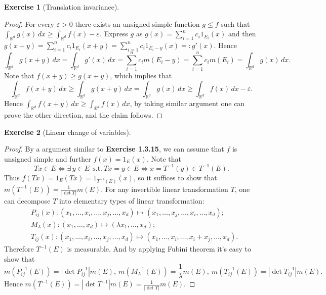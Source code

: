 \documentclass[a4paper]{article}
\newtheorem{ex}{Exercise}[subsection]
\begin{document}
\begin{ex}[Translation invariance]\end{ex}
\begin{proof}
For every $\varepsilon > 0$ there exists an unsigned simple function $g \leq f$ such that 
$\int_{\mathbb{R}^d} g(x)\,dx \geq \int_{\mathbb{R}^d} f(x) - \varepsilon$. Express $g$ as $g(x) = \sum_{i = 1}^n c_i1_{E_i}(x)$ and 
then $g(x + y) = \sum_{i = 1}^n c_i1_{E_i}(x + y) = \sum_{i = 1}^n c_i1_{E_i - y}(x) =: g'(x)$. Hence$$
\int_{\mathbb{R}^d}g(x + y)\,dx = \int_{\mathbb{R}^d} g'(x)\,dx = \sum_{i = 1}^n c_im(E_i - y) = 
\sum_{i = 1}^n c_im(E_i) = \int_{\mathbb{R}^d}g(x)\,dx.
$$Note that $f(x + y) \geq g(x + y)$, which implies that $$
\int_{\mathbb{R}^d} f(x + y)\,dx \geq \int_{\mathbb{R}^d} g(x + y)\,dx = \int_{\mathbb{R}^d} g(x)\,dx \geq 
\int_{\mathbb{R}^d} f(x)\,dx - \varepsilon.
$$Hence $\int_{\mathbb{R}^d} f(x + y)\,dx \geq \int_{\mathbb{R}^d} f(x)\,dx$, by taking similar argument one can 
prove the other direction, and the claim follows.
\end{proof}

\begin{ex}[Linear change of variables]\end{ex}
\begin{proof}
By a argument similar to {\bfseries Exercise 1.3.15}, we can assume that $f$ is unsigned simple and further 
$f(x) = 1_E(x)$. Note that $$
Tx \in E \Leftrightarrow \exists\, y \in E\ \ \mathrm{s.t.}\ Tx = y \in E \Leftrightarrow x = T^{-1}(y) \in T^{-1}(E).
$$Thus $f(Tx) = 1_E(Tx) = 1_{T^{-1}(E)}(x)$, so it suffices to show that $m(T^{-1}(E)) = \frac{1}{|\det T|} m(E)$.
For any invertible linear transformation $T$, one can decompose $T$ into elementary types of linear transformation:\begin{align*}
&P_{ij}(x): (x_1, \dots, x_i, \dots, x_j, \dots, x_d) \mapsto (x_1, \dots, x_j, \dots, x_i, \dots, x_d);\\
&M_{\lambda}(x): (x_1, \dots, x_d) \mapsto (\lambda x_1, \dots, x_d);\\
&T_{ij}(x): (x_1, \dots, x_i, \dots, x_j, \dots, x_d) \mapsto (x_1, \dots, x_i, \dots, x_i + x_j, \dots, x_d).
\end{align*} 
Therefore $T^{-1}(E)$ is measurable. And by applying Fubini theorem it's easy to show that 
$$m(P_{ij}^{-1}(E)) = |\det P_{ij}^{-1}|m(E),\ m(M_\lambda^{-1}(E)) = \frac{1}{\lambda}m(E),\ m(T_{ij}^{-1}(E)) = |\det T_{ij}^{-1}|m(E).$$
Hence $m(T^{-1}(E)) = |\det T^{-1}|m(E) = \frac{1}{|\det T|}m(E)$.
\end{proof}
\end{document}
